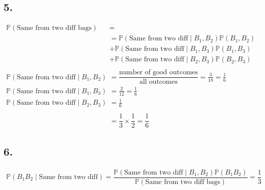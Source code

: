 \documentclass[12pt, letterpaper]{article}
\theoremstyle{definition}
\renewcommand{\P}{\mathbb{P}}
\begin{document}
\subsection*{5.}
\begin{align*}
\P(\text{Same from two diff bags})&=\\
&=\P(\text{Same from two diff} \mid B_1,B_2)\P(B_1,B_2)\\
&+\P(\text{Same from two diff} \mid B_1,B_3)\P(B_1,B_3)\\
&+\P(\text{Same from two diff} \mid B_2,B_3)\P(B_2,B_3)\\
\\
\P(\text{Same from two diff} \mid B_1,B_2)&=\dfrac{\text{number of good outcomes}}{\text{all outcomes}}=\frac{3}{18}=\frac{1}{6}\\
\P(\text{Same from two diff} \mid B_1,B_3)&=\frac{2}{12}=\frac{1}{6}\\
\P(\text{Same from two diff} \mid B_2,B_3)&=\frac{1}{6}\\
\\
&=\dfrac{1}{3}\times\dfrac{1}{2}=\dfrac{1}{6}
\end{align*}
\subsection*{6.}
\begin{align*}
\P(B_1B_2 \mid \text{Same from two diff})=\dfrac{\P(\text{Same from two diff} \mid B_1,B_2)\P(B_1B_2)}{\P(\text{Same from two diff bags})}=\dfrac{1}{3}
\end{align*}
\end{document}
